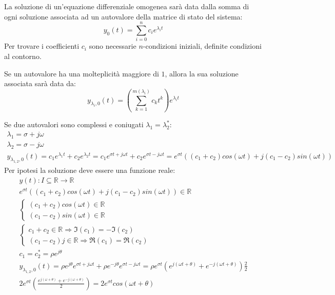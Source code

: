 \documentclass{article}
\numberwithin{equation}{subsection}
\begin{document}
La soluzione di un'equazione differenziale omogenea sarà data dalla somma di ogni soluzione associata ad un autovalore della matrice di stato del sistema:
\begin{equation}
    y_0(t)=\displaystyle\sum_{i=0}^nc_ie^{\lambda_it}
\end{equation} 
Per trovare i coefficienti $c_i$ sono necessarie $n$-condizioni iniziali, definite condizioni al contorno. 

Se un autovalore ha una molteplicità maggiore di $1$, allora la sua soluzione associata sarà data da:
\begin{equation}
    y_{\lambda_i,0}(t)=\left(\displaystyle\sum_{k=1}^{m(\lambda_i)}c_kt^{k}\right)e^{\lambda_it}
\end{equation}

Se due autovalori sono complessi e coniugati $\lambda_1=\lambda_2^{*}$:
\begin{gather}
    \lambda_1=\sigma+j\omega\\
    \lambda_2=\sigma-j\omega\\
    y_{\lambda_{1,2},0}(t)=c_1e^{\lambda_1t}+c_2e^{\lambda_2t}=c_1e^{\sigma t +j\omega t}+c_2e^{\sigma t-j\omega t}=e^{\sigma t}((c_1+c_2)cos(\omega t)+j(c_1-c_2)sin(\omega t))
\end{gather}
Per ipotesi la soluzione deve essere una funzione reale: 
\begin{gather}
    y(t):I\subseteq\mathbb{R}\to\mathbb{R}\\
    e^{\sigma t}((c_1+c_2)cos(\omega t)+j(c_1-c_2)sin(\omega t))\in\mathbb{R}\\
    \begin{cases}
        (c_1+c_2)cos(\omega t)\in\mathbb{R}\\
        (c_1-c_2)sin(\omega t)\in\mathbb{R}
    \end{cases}\\
    \begin{cases}
        c_1+c_2\in\mathbb{R}\Rightarrow \Im(c_1)=-\Im(c_2)\\
        (c_1-c_2)j\in\mathbb{R}\Rightarrow \Re(c_1)=\Re(c_2)
    \end{cases}\\
    c_1=c_2^*=\rho e^{j\theta}\\
    y_{\lambda_{1,2},0}(t)=\rho e^{j\theta}e^{\sigma t +j\omega t}+\rho e^{-j\theta}e^{\sigma t-j\omega t}=\rho e^{\sigma t}\left(e^{j(\omega t+\theta)}+e^{-j(\omega t+\theta)}\right)\displaystyle\frac{2}{2}\\
    2e^{\sigma t}\left(\displaystyle\frac{e^{j(\omega+\theta)}+e^{-j(\omega+\theta)}}{2}\right)=2e^{\sigma t}cos(\omega t+\theta)
\end{gather}
\end{document}
